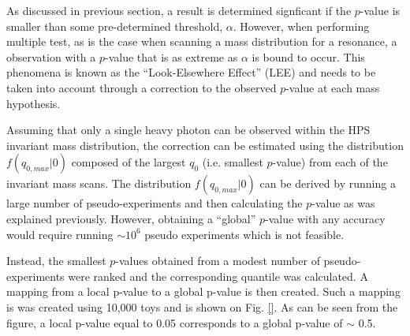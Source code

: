 As discussed in previous section, a result is determined signficant if the 
$p$-value is smaller than some pre-determined threshold, $\alpha$.  However, 
when performing multiple test, as is the case when scanning a mass distribution
for a resonance, a observation with a $p$-value that is as extreme as $\alpha$
is bound to occur.  This phenomena is known as the ``Look-Elsewhere Effect'' (LEE)
and needs to be taken into account through a correction to the observed $p$-value
at each mass hypothesis.

Assuming that only a single heavy photon can be observed within the HPS invariant
mass distribution, the correction can be estimated using the distribution 
$f(q_{0, max} | 0)$ composed of the largest $q_{0}$ (i.e. smallest $p$-value)
from each of the invariant mass scans.  The distribution $f(q_{0, max} | 0)$ can
be derived by running a large number of pseudo-experiments and then calculating
the $p$-value as was explained previously.  However, obtaining a ``global''
$p$-value with any accuracy would require running $\sim 10^{6}$ pseudo experiments
which is not feasible.  

Instead, the smallest $p$-values obtained from a modest number of pseudo-experiments were
ranked and the corresponding quantile was calculated.  A mapping from a local 
p-value to a global p-value is then created.  Such a mapping is was created using
10,000 toys and is shown on Fig. \ref{}.  As can be seen from the figure, a 
local p-value equal to 0.05 corresponds to a global p-value of $\sim$ 0.5.



 


